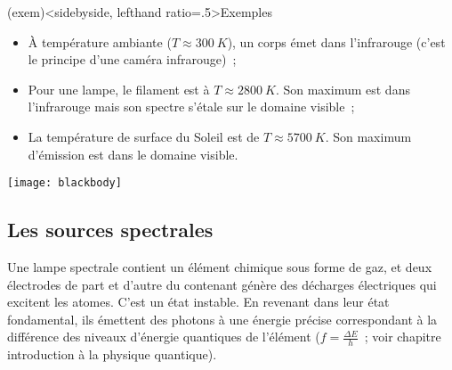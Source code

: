 \documentclass[../../main/main.tex]{subfiles}
\begin{document}
\begin{tcb}(exem)<sidebyside, lefthand ratio=.5>{Exemples}
	\begin{itemize}
		\item À température ambiante ($T \approx \SI{300}{K}$), un corps émet
		      dans l'infrarouge (c'est le principe d'une caméra infrarouge)~;
		\item Pour une lampe, le filament est à $T \approx \SI{2800}{K}$. Son
		      maximum est dans l'infrarouge mais son spectre s'étale sur le
		      domaine visible~;
		\item La température de surface du Soleil est de $T \approx
			      \SI{5700}{K}$. Son maximum d'émission est dans le domaine visible.
	\end{itemize}
	\begin{center}
		\pgfspectra[element={H,Fe,Mg,Na},
		absorption, line intensity=40, Imin=.05,
		axis, axis color=white, axis font color=black,
		axis ticks=4, axis unit precision=2,
		axis label text={Longueur d'onde [$\si{nm}$]},
		back=visible10,
		]
		\label{fig:spec_sun}
	\end{center}
	\tcblower
	\begin{center}
		\texttt{[image: blackbody]}
		\label{fig:cps_chaud}
	\end{center}
\end{tcb}

\subsection{Les sources spectrales}

Une lampe spectrale contient un élément chimique sous forme de gaz, et deux
électrodes de part et d'autre du contenant génère des décharges électriques qui
excitent les atomes. C'est un état instable. En revenant dans leur état
fondamental, ils émettent des photons à une énergie précise correspondant à la
différence des niveaux d'énergie quantiques de l'élément ($f = \frac{\Delta
		E}{h}$~; voir chapitre introduction à la physique quantique).
\end{document}
